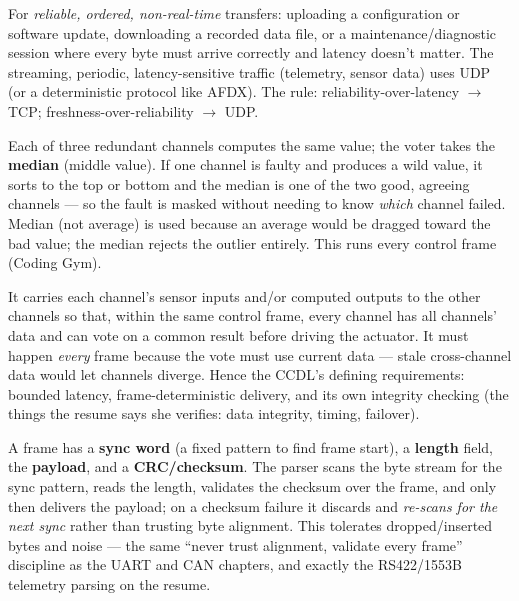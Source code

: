 For \emph{reliable, ordered, non-real-time} transfers: uploading a
configuration or software update, downloading a recorded data file, or a
maintenance/diagnostic session where every byte must arrive correctly and
latency doesn't matter. The streaming, periodic, latency-sensitive traffic
(telemetry, sensor data) uses UDP (or a deterministic protocol like AFDX). The
rule: reliability-over-latency $\rightarrow$ TCP; freshness-over-reliability
$\rightarrow$ UDP.

Each of three redundant channels computes the same value; the voter takes the
\textbf{median} (middle value). If one channel is faulty and produces a wild
value, it sorts to the top or bottom and the median is one of the two good,
agreeing channels --- so the fault is masked without needing to know \emph{which}
channel failed. Median (not average) is used because an average would be dragged
toward the bad value; the median rejects the outlier entirely. This runs every
control frame (Coding Gym).

It carries each channel's sensor inputs and/or computed outputs to the other
channels so that, within the same control frame, every channel has all channels'
data and can vote on a common result before driving the actuator. It must happen
\emph{every} frame because the vote must use current data --- stale cross-channel
data would let channels diverge. Hence the CCDL's defining requirements:
bounded latency, frame-deterministic delivery, and its own integrity checking
(the things the resume says she verifies: data integrity, timing, failover).

A frame has a \textbf{sync word} (a fixed pattern to find frame start), a
\textbf{length} field, the \textbf{payload}, and a \textbf{CRC/checksum}. The
parser scans the byte stream for the sync pattern, reads the length, validates
the checksum over the frame, and only then delivers the payload; on a checksum
failure it discards and \emph{re-scans for the next sync} rather than trusting
byte alignment. This tolerates dropped/inserted bytes and noise --- the same
``never trust alignment, validate every frame'' discipline as the UART and CAN
chapters, and exactly the RS422/1553B telemetry parsing on the resume.


